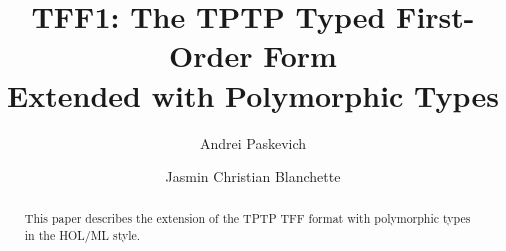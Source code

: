 \documentclass[draft,a4paper]{llncs}
\begin{document}
\title{
TFF1: The TPTP Typed First-Order Form \\ Extended with Polymorphic Types}

\author{
Andrei Paskevich \and Jasmin Christian Blanchette
}


\maketitle

\begin{abstract}
This paper describes the extension of the TPTP TFF format with polymorphic
types in the HOL/ML style.
\end{abstract}











\end{document}
